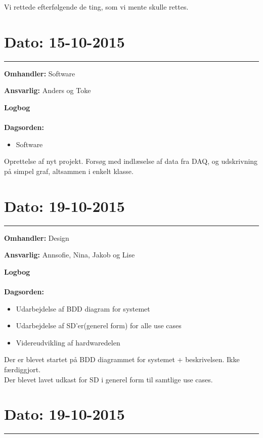 Vi rettede efterfølgende de ting, som vi mente skulle rettes.

	
	
	
\section{Dato: 15-10-2015 }
\hrule

\textbf{Omhandler:} Software

\textbf{Ansvarlig:} Anders og Toke

\textbf{Logbog}
\\
\\
\textbf{Dagsorden:}
\begin{itemize}
	\item Software
\end{itemize}

Oprettelse af nyt projekt. Forsøg med indlæselse af data fra DAQ, og udskrivning på simpel graf, altsammen i enkelt klasse.  




\section{Dato: 19-10-2015 }
\hrule

\textbf{Omhandler:} Design 

\textbf{Ansvarlig:} Annsofie, Nina, Jakob og Lise

\textbf{Logbog}
\\
\\
\textbf{Dagsorden:}
\begin{itemize}
	\item Udarbejdelse af BDD diagram for systemet
	\item Udarbejdelse af SD'er(generel form) for alle use cases
	\item Videreudvikling af hardwaredelen
\end{itemize}

Der er blevet startet på BDD diagrammet for systemet + beskrivelsen. Ikke færdiggjort.\\
Der blevet lavet udkast for SD i generel form til samtlige use cases. 




\section{Dato: 19-10-2015 }
\hrule

